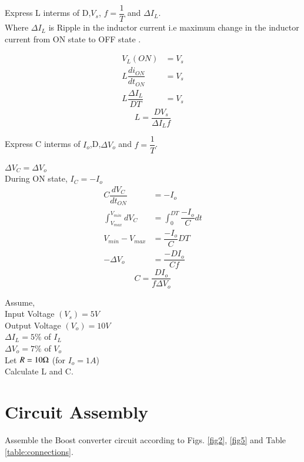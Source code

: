\documentclass[journal,12pt,twocolumn]{IEEEtran}
\begin{document}
\begin{problem}
Express L interms of D,$V_{s}$, $f=\dfrac{1}{T}$ and $\Delta I_{L}$.\\ Where $\Delta I_{L}$ is Ripple in the inductor  current i.e maximum change in the inductor current from ON state to OFF state . 

\end{problem}
\solution
\begin{align*}
  V_{L}(ON) &= V_{s} \\
  L \dfrac{di_{ON}}{dt_{ON}} &=V_{s} \\
  L \dfrac{\Delta I_{L}}{DT} &=V_{s} 
  \end{align*}
\begin{equation}
\label{eq:eq1}
 L =\dfrac{DV_{s}}{\Delta I_{L}f}
\end{equation}
\begin{problem}
Express C interms of $I_{o}$,D,$\Delta V_{o}$ and $f=\dfrac{1}{T}$.
\end{problem}
\solution
 $ \Delta V_{C} = \Delta V_{o} $  \\
 During ON state,   $I_{C} = - I_{o}$   
 \begin{align*}
 C \dfrac{dV_{C}}{dt_{ON}} &= - I_{o} \\
 \int_{V_{max}}^{V_{min}} dV_{C} &= \int_{0}^{DT}\dfrac{-I_{o}}{C} dt \\
 V_{min} - V_{max} &= \dfrac{-I_{o}}{C} D T \\
 - \Delta V_{o} &= \dfrac{-DI_{o}}{Cf} 
 \end{align*}
 \begin{equation}
\label{eq:eq2}
 C = \dfrac{DI_{o}}{f\Delta V_{o}}
\end{equation}
\begin{problem}
Assume,\\
Input Voltage $(V_{s}) = 5V$\\
Output Voltage $(V_{o}) = 10V$\\
$\Delta I_{L} = 5 \% $ of $I_{L}$\\
$\Delta V_{o} = 7 \% $ of $V_{o}$ \\
Let $R = 10 \ohm $ (for $I_{o}=1A$)\\
Calculate L and C.
\end{problem}

\section{Circuit Assembly}
\begin{problem}
Assemble the Boost converter circuit according to Figs. \ref{fig2}, \ref{fig5} and Table \ref{table:connections}.
\end{problem}
\end{document}
